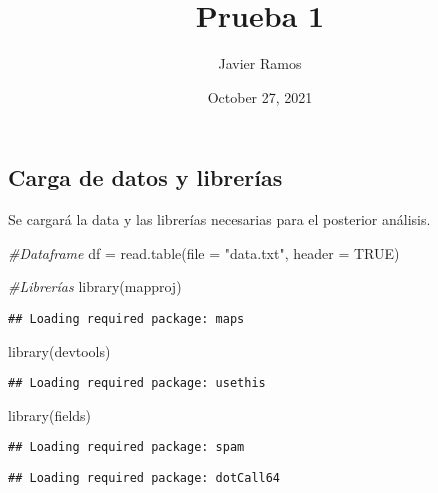 \documentclass[
]{article}
\title{Prueba 1}
\author{Javier Ramos}
\date{October 27, 2021}
\newenvironment{Shaded}{\begin{snugshade}}{\end{snugshade}}
\newcommand{\AttributeTok}[1]{\textcolor[rgb]{0.77,0.63,0.00}{#1}}
\newcommand{\CommentTok}[1]{\textcolor[rgb]{0.56,0.35,0.01}{\textit{#1}}}
\newcommand{\ConstantTok}[1]{\textcolor[rgb]{0.00,0.00,0.00}{#1}}
\newcommand{\FunctionTok}[1]{\textcolor[rgb]{0.00,0.00,0.00}{#1}}
\newcommand{\NormalTok}[1]{#1}
\newcommand{\OtherTok}[1]{\textcolor[rgb]{0.56,0.35,0.01}{#1}}
\newcommand{\StringTok}[1]{\textcolor[rgb]{0.31,0.60,0.02}{#1}}
\begin{document}
\maketitle

\hypertarget{carga-de-datos-y-libreruxedas}{%
\subsection{Carga de datos y
librerías}\label{carga-de-datos-y-libreruxedas}}

Se cargará la data y las librerías necesarias para el posterior
análisis.

\begin{Shaded}
\begin{Highlighting}[]
\CommentTok{\#Dataframe}
\NormalTok{df }\OtherTok{=} \FunctionTok{read.table}\NormalTok{(}\AttributeTok{file =} \StringTok{"data.txt"}\NormalTok{, }\AttributeTok{header =} \ConstantTok{TRUE}\NormalTok{)}

\CommentTok{\#Librerías}
\FunctionTok{library}\NormalTok{(mapproj)}
\end{Highlighting}
\end{Shaded}

\begin{verbatim}
## Loading required package: maps
\end{verbatim}

\begin{Shaded}
\begin{Highlighting}[]
\FunctionTok{library}\NormalTok{(devtools)}
\end{Highlighting}
\end{Shaded}

\begin{verbatim}
## Loading required package: usethis
\end{verbatim}

\begin{Shaded}
\begin{Highlighting}[]
\FunctionTok{library}\NormalTok{(fields)}
\end{Highlighting}
\end{Shaded}

\begin{verbatim}
## Loading required package: spam
\end{verbatim}

\begin{verbatim}
## Loading required package: dotCall64
\end{verbatim}
\end{document}
